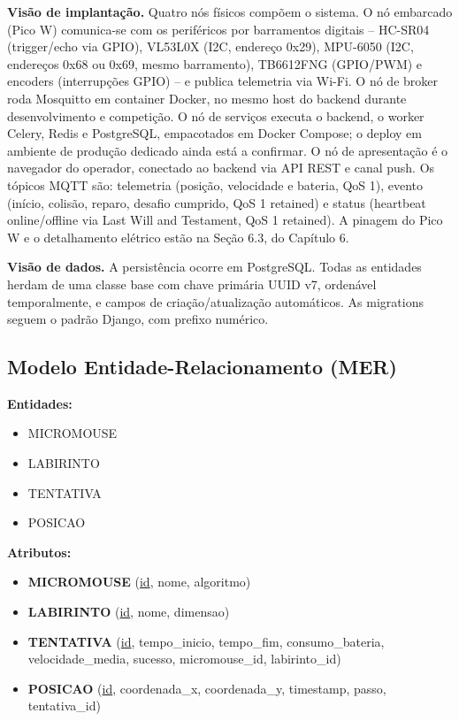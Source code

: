     \textbf{Visão de implantação.} Quatro nós físicos compõem o sistema. O nó embarcado (Pico W) comunica-se com os periféricos por barramentos digitais -- HC-SR04 (trigger/echo via GPIO), VL53L0X (I2C, endereço 0x29), MPU-6050 (I2C, endereços 0x68 ou 0x69, mesmo barramento), TB6612FNG (GPIO/PWM) e encoders (interrupções GPIO) -- e publica telemetria via Wi-Fi. O nó de broker roda Mosquitto em container Docker, no mesmo host do backend durante desenvolvimento e competição. O nó de serviços executa o backend, o worker Celery, Redis e PostgreSQL, empacotados em Docker Compose; o deploy em ambiente de produção dedicado ainda está a confirmar. O nó de apresentação é o navegador do operador, conectado ao backend via API REST e canal push. Os tópicos MQTT são: telemetria (posição, velocidade e bateria, QoS 1), evento (início, colisão, reparo, desafio cumprido, QoS 1 retained) e status (heartbeat online/offline via Last Will and Testament, QoS 1 retained). A pinagem do Pico W e o detalhamento elétrico estão na Seção 6.3, do Capítulo 6.

    \textbf{Visão de dados.} A persistência ocorre em PostgreSQL. Todas as entidades herdam de uma classe base com chave primária UUID v7, ordenável temporalmente, e campos de criação/atualização automáticos. As migrations seguem o padrão Django, com prefixo numérico.


\subsection{Modelo Entidade-Relacionamento (MER)}

\textbf{Entidades:}

\begin{itemize}
    \item MICROMOUSE
    \item LABIRINTO
    \item TENTATIVA
    \item POSICAO
\end{itemize}

\vspace{0.5cm}

\textbf{Atributos:}

\begin{itemize}
    \item \textbf{MICROMOUSE} (\underline{id}, nome, algoritmo)

    \item \textbf{LABIRINTO} (\underline{id}, nome, dimensao)

    \item \textbf{TENTATIVA} (\underline{id}, tempo\_inicio, tempo\_fim, consumo\_bateria, velocidade\_media, sucesso, micromouse\_id, labirinto\_id)

    \item \textbf{POSICAO} (\underline{id}, coordenada\_x, coordenada\_y, timestamp, passo, tentativa\_id)
\end{itemize}


